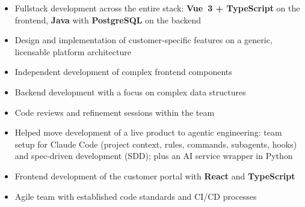 \begin{itemize}
  \item Fullstack development across the entire stack: \textbf{Vue~3 + TypeScript} on the frontend, \textbf{Java} with \textbf{PostgreSQL} on the backend
  \item Design and implementation of customer-specific features on a generic, licensable platform architecture
  \item Independent development of complex frontend components
  \item Backend development with a focus on complex data structures
  \item Code reviews and refinement sessions within the team
  \item Helped move development of a live product to agentic engineering: team setup for Claude Code (project context, rules, commands, subagents, hooks) and spec-driven development (SDD); plus an AI service wrapper in Python
\end{itemize}

\begin{itemize}
  \item Frontend development of the customer portal with \textbf{React} and \textbf{TypeScript}
  \item Agile team with established code standards and CI/CD processes
\end{itemize}

